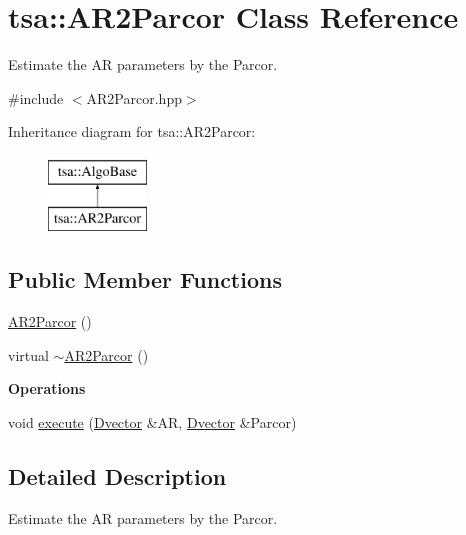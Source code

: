 \hypertarget{classtsa_1_1_a_r2_parcor}{}\section{tsa\+:\+:A\+R2\+Parcor Class Reference}
\label{classtsa_1_1_a_r2_parcor}


Estimate the AR parameters by the Parcor.  




{\ttfamily \#include $<$A\+R2\+Parcor.\+hpp$>$}

Inheritance diagram for tsa\+:\+:A\+R2\+Parcor\+:\begin{figure}[H]
\begin{center}
\leavevmode
\includegraphics[height=2.000000cm]{classtsa_1_1_a_r2_parcor}
\end{center}
\end{figure}
\subsection*{Public Member Functions}
\begin{DoxyCompactItemize}
\item 
\hyperlink{classtsa_1_1_a_r2_parcor_af28c0ed978d27202d9f7f5df6464efef}{A\+R2\+Parcor} ()
\item 
virtual \hyperlink{classtsa_1_1_a_r2_parcor_a8aaf9b98dd73626724c6c83bf7e3a5ed}{$\sim$\+A\+R2\+Parcor} ()
\end{DoxyCompactItemize}
\begin{Indent}\textbf{ Operations}\par
\begin{DoxyCompactItemize}
\item 
void \hyperlink{classtsa_1_1_a_r2_parcor_a238bba748285d03e10622d2f2f0cc108}{execute} (\hyperlink{namespacetsa_a8900fb03d849baf447a1a0efe2561fb2}{Dvector} \&AR, \hyperlink{namespacetsa_a8900fb03d849baf447a1a0efe2561fb2}{Dvector} \&Parcor)
\end{DoxyCompactItemize}
\end{Indent}


\subsection{Detailed Description}
Estimate the AR parameters by the Parcor. 

